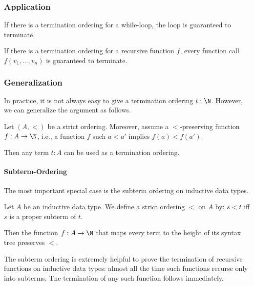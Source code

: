 \subsubsection{Application}

If there is a termination ordering for a while-loop, the loop is guaranteed to terminate.

If there is a termination ordering for a recursive function $f$, every function call $f(v_1,\ldots,v_n)$ is guaranteed to terminate.

\subsubsection{Generalization}

In practice, it is not always easy to give a termination ordering $t:\N$.
However, we can generalize the argument as follows.

Let $(A,<)$ be a strict ordering.
Moreover, assume a $<$-preserving function $f:A\to \N$, i.e., a function $f$ such $a<a'$ implies $f(a)<f(a')$.

Then any term $t:A$ can be used as a termination ordering.

\paragraph{Subterm-Ordering}
The most important special case is the subterm ordering on inductive data types.

Let $A$ be an inductive data type.
We define a strict ordering $<$ on $A$ by: $s<t$ iff $s$ is a proper subterm of $t$.

Then the function $f:A\to \N$ that maps every term to the height of its syntax tree preserves $<$.

The subterm ordering is extremely helpful to prove the termination of recursive functions on inductive data types: almost all the time such functions recurse only into subterms.
The termination of any such function follows immediately.